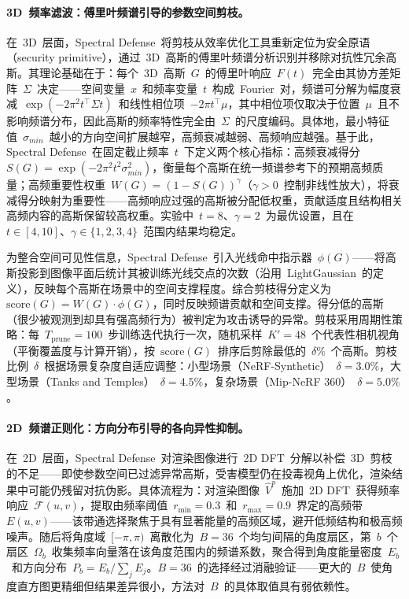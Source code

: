 \paragraph{3D~频率滤波：傅里叶频谱引导的参数空间剪枝。}
在~3D~层面，Spectral Defense~将剪枝从效率优化工具重新定位为安全原语（security primitive），通过~3D~高斯的傅里叶频谱分析识别并移除对抗性冗余高斯。其理论基础在于：每个~3D~高斯~$G$~的傅里叶响应~$F(t)$~完全由其协方差矩阵~$\Sigma$~决定——空间变量~$x$~和频率变量~$t$~构成~Fourier~对，频谱可分解为幅度衰减~$\exp(-2\pi^2 t^\top \Sigma t)$~和线性相位项~$-2\pi t^\top \mu$，其中相位项仅取决于位置~$\mu$~且不影响频谱分布，因此高斯的频率特性完全由~$\Sigma$~的尺度编码。具体地，最小特征值~$\sigma_{min}$~越小的方向空间扩展越窄，高频衰减越弱、高频响应越强。基于此，Spectral Defense~在固定截止频率~$t$~下定义两个核心指标：高频衰减得分~$S(G) = \exp(-2\pi^2 t^2 \sigma_{min}^2)$，衡量每个高斯在统一频谱参考下的预期高频质量；高频重要性权重~$W(G) = (1-S(G))^\gamma$（$\gamma > 0$~控制非线性放大），将衰减得分映射为重要性——高频响应过强的高斯被分配低权重，贡献适度且结构相关高频内容的高斯保留较高权重。实验中~$t=8$、$\gamma=2$~为最优设置，且在~$t \in [4,10]$、$\gamma \in \{1,2,3,4\}$~范围内结果均稳定。

为整合空间可见性信息，Spectral Defense~引入光线命中指示器~$\phi(G)$——将高斯投影到图像平面后统计其被训练光线交点的次数（沿用~LightGaussian~的定义），反映每个高斯在场景中的空间支撑程度。综合剪枝得分定义为~$\text{score}(G) = W(G) \cdot \phi(G)$，同时反映频谱贡献和空间支撑。得分低的高斯（很少被观测到却具有强高频行为）被判定为攻击诱导的异常。剪枝采用周期性策略：每~$T_{\text{prune}}=100$~步训练迭代执行一次，随机采样~$K'=48$~个代表性相机视角（平衡覆盖度与计算开销），按~$\text{score}(G)$~排序后剪除最低的~$\delta\%$~个高斯。剪枝比例~$\delta$~根据场景复杂度自适应调整：小型场景（NeRF-Synthetic）~$\delta=3.0\%$，大型场景（Tanks and Temples）~$\delta=4.5\%$，复杂场景（Mip-NeRF 360）~$\delta=5.0\%$。

\paragraph{2D~频谱正则化：方向分布引导的各向异性抑制。}
在~2D~层面，Spectral Defense~对渲染图像进行~2D DFT~分解以补偿~3D~剪枝的不足——即使参数空间已过滤异常高斯，受害模型仍在投毒视角上优化，渲染结果中可能仍残留对抗伪影。具体流程为：对渲染图像~$\hat{V}^p$~施加~2D DFT~获得频率响应~$\mathcal{F}(u,v)$，提取由频率阈值~$r_{\text{min}}=0.3$~和~$r_{\text{max}}=0.9$~界定的高频带~$E(u,v)$——该带通选择聚焦于具有显著能量的高频区域，避开低频结构和极高频噪声。随后将角度域~$[-\pi, \pi)$~离散化为~$B=36$~个均匀间隔的角度扇区，第~$b$~个扇区~$\Omega_b$~收集频率向量落在该角度范围内的频谱系数，聚合得到角度能量密度~$E_b$~和方向分布~$P_b = E_b / \sum_j E_j$。$B=36$~的选择经过消融验证——更大的~$B$~使角度直方图更精细但结果差异很小，方法对~$B$~的具体取值具有弱依赖性。

